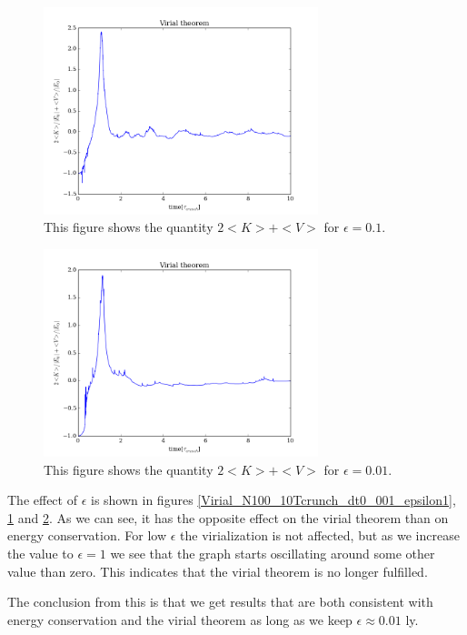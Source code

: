 \documentclass{aa}   %
\begin{document}
\begin{figure}[hbtp]
 \centering
 \includegraphics[width=80mm]{Virial_N100_10Tcrunch_dt0_001_epsilon0_1.png}
 \caption[]{\label{Virial_N100_10Tcrunch_dt0_001_epsilon0_1}
   This figure shows the quantity $2<K> + <V>$ for $\epsilon = 0.1$.
 }
\end{figure}

\begin{figure}[hbtp]
 \centering
 \includegraphics[width=80mm]{Virial_N100_10Tcrunch_dt0_001_epsilon0_01.png}
 \caption[]{\label{Virial_N100_10Tcrunch_dt0_001_epsilon0_01}
   This figure shows the quantity $2<K> + <V>$ for $\epsilon = 0.01$.
 }
\end{figure}



The effect of $\epsilon$ is shown in figures \ref{Virial_N100_10Tcrunch_dt0_001_epsilon1}, \ref{Virial_N100_10Tcrunch_dt0_001_epsilon0_1} and \ref{Virial_N100_10Tcrunch_dt0_001_epsilon0_01}. As we can see, it has the opposite effect on the virial theorem  than on energy conservation. For low $\epsilon$ the virialization is not affected, but as we increase the value to $\epsilon = 1$ we see that the graph starts oscillating around some other value than zero. This indicates that the virial theorem is no longer fulfilled.

The conclusion from this is that we get results that are both consistent with energy conservation and the virial theorem as long as we keep $\epsilon \approx 0.01$ ly. 
\end{document}
